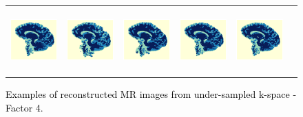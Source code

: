 \documentclass[review]{elsarticle}
\begin{document}
\begin{figure}[H]
\begin{raggedleft}
\begin{tabular}{cccccc}
			\includegraphics[width=2.5cm,height=2.5cm]{include/grp2/factor4/012-HH-1211-T1/012-HH-1211-T1_segs__35} &
			\includegraphics[width=2.5cm,height=2.5cm]{include/grp2/factor4/012-HH-1211-T1/012-HH-1211-T1_segs__zeroPadding_35} & \includegraphics[width=2.5cm,height=2.5cm]{include/grp2/factor4/012-HH-1211-T1/012-HH-1211-T1_segs__CS_35} & \includegraphics[width=2.5cm]{include/grp2/factor4/012-HH-1211-T1/012-HH-1211-T1_segs__IMCNNL2TUNE_35} & \includegraphics[width=2.5cm,height=2.5cm]{include/grp2/factor4/012-HH-1211-T1/012-HH-1211-T1_segs__predict_35}
			
			
		\end{tabular}
		\par\end{raggedleft}
	\raggedright{}\caption{\textcolor{black}{\footnotesize{}Examples of reconstructed MR images from under-sampled k-space - Factor 4.}}
	\label{fig:example_factor_4} 
\end{figure}
\end{document}
